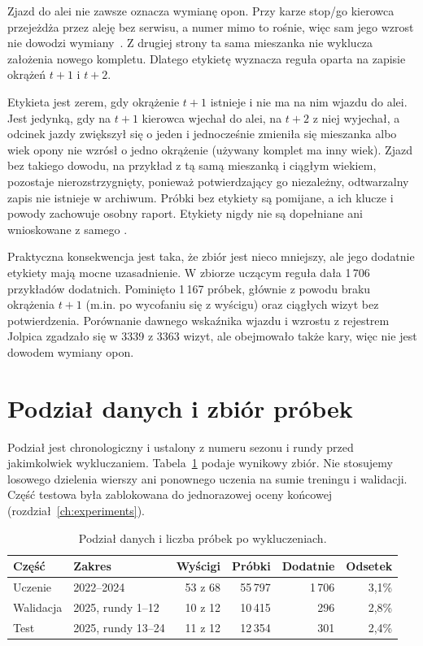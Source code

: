 Zjazd do alei nie zawsze oznacza wymianę opon. Przy karze stop/go
kierowca przejeżdża przez aleję bez serwisu, a numer 
mimo to rośnie, więc sam jego wzrost nie dowodzi wymiany~\cite{findings}.
Z drugiej strony ta sama mieszanka nie wyklucza założenia nowego kompletu.
Dlatego etykietę wyznacza reguła oparta na zapisie okrążeń $t+1$ i $t+2$.

Etykieta jest zerem, gdy okrążenie $t+1$ istnieje i nie ma na nim wjazdu do
alei. Jest jedynką, gdy na $t+1$ kierowca wjechał do alei, na $t+2$ z niej
wyjechał, a odcinek jazdy zwiększył się o jeden i jednocześnie zmieniła się
mieszanka albo wiek opony nie wzrósł o jedno okrążenie (używany komplet
ma inny wiek). Zjazd bez takiego dowodu, na przykład z tą samą mieszanką
i ciągłym wiekiem, pozostaje nierozstrzygnięty, ponieważ potwierdzający
go niezależny, odtwarzalny zapis nie istnieje w archiwum. Próbki
bez etykiety są pomijane, a ich klucze i powody zachowuje osobny raport.
Etykiety nigdy nie są dopełniane ani wnioskowane z samego .

Praktyczna konsekwencja jest taka, że zbiór jest nieco mniejszy, ale jego
dodatnie etykiety mają mocne uzasadnienie. W zbiorze uczącym reguła
dała 1\,706 przykładów dodatnich. Pominięto 1\,167 próbek, głównie
z powodu braku okrążenia $t+1$ (m.in. po wycofaniu się z wyścigu) oraz
ciągłych wizyt bez potwierdzenia. Porównanie dawnego wskaźnika wjazdu
i wzrostu  z rejestrem Jolpica zgadzało się w 3339 z 3363 wizyt,
ale obejmowało także kary, więc nie jest dowodem wymiany opon.

\section{Podział danych i zbiór próbek}

Podział jest chronologiczny i ustalony z numeru sezonu i rundy przed
jakimkolwiek wykluczaniem. Tabela~\ref{tab:splits} podaje wynikowy zbiór.
Nie stosujemy losowego dzielenia wierszy ani ponownego uczenia na sumie
treningu i walidacji. Część testowa była zablokowana do jednorazowej oceny
końcowej (rozdział~\ref{ch:experiments}).

\begin{table}[htbp]
\centering\small
\caption{Podział danych i liczba próbek po wykluczeniach.}
\label{tab:splits}
\begin{tabular}{llrrrr}
\toprule
Część & Zakres & Wyścigi & Próbki & Dodatnie & Odsetek \\
\midrule
Uczenie & 2022--2024 & 53 z 68 & 55\,797 & 1\,706 & 3,1\% \\
Walidacja & 2025, rundy 1--12 & 10 z 12 & 10\,415 & 296 & 2,8\% \\
Test & 2025, rundy 13--24 & 11 z 12 & 12\,354 & 301 & 2,4\% \\
\bottomrule
\end{tabular}
\end{table}

